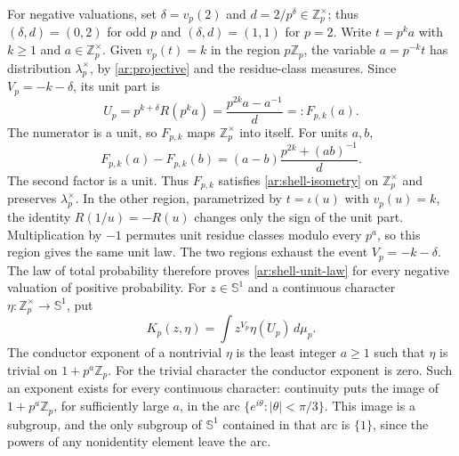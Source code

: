 \documentclass[twoside]{aomart}
\makeatletter
\theoremstyle{paperplain}
\theoremstyle{paperdefinition}
\renewenvironment{proof}[1][\proofname]{\par\pushQED{\qed}%
  \normalfont\topsep6\p@\@plus3\p@\relax\trivlist
  \item[\hskip\labelsep\itshape #1\@addpunct{.}]\ignorespaces
}{\popQED\endtrivlist\@endpefalse}
\newcommand{\Z}{\mathbb Z}
\numberwithin{equation}{section}
\makeatother
\begin{document}
\begin{proof}
For negative valuations, set $\delta=v_p(2)$ and
$d=2/p^\delta\in\Z_p^\times$; thus $(\delta,d)=(0,2)$
for odd $p$ and $(\delta,d)=(1,1)$ for $p=2$.
Write $t=p^k a$ with $k\ge1$ and $a\in\Z_p^\times$.
Given $v_p(t)=k$ in the region $p\Z_p$, the variable
$a=p^{-k}t$ has distribution $\lambda_p^\times$,
by \eqref{ar:projective} and the residue-class measures.
Since $V_p=-k-\delta$, its unit part is
\begin{equation*}
 U_p=p^{k+\delta}R(p^k a)
    =\frac{p^{2k}a-a^{-1}}d=:F_{p,k}(a).
\end{equation*}
The numerator is a unit, so $F_{p,k}$ maps
$\Z_p^\times$ into itself. For units $a,b$,
\begin{equation*}
 F_{p,k}(a)-F_{p,k}(b)
   =(a-b)\frac{p^{2k}+(ab)^{-1}}d.
\end{equation*}
The second factor is a unit. Thus $F_{p,k}$ satisfies
\eqref{ar:shell-isometry} on $\Z_p^\times$ and preserves
$\lambda_p^\times$. In the other region, parametrized by
$t=\iota(u)$ with $v_p(u)=k$, the identity
$R(1/u)=-R(u)$ changes only the sign of the unit part.
Multiplication by $-1$ permutes unit residue classes
modulo every $p^a$, so this region gives the same unit law.
The two regions exhaust the event $V_p=-k-\delta$.
The law of total probability therefore proves
\eqref{ar:shell-unit-law} for every negative valuation
of positive probability.
\end{proof}
For $z\in\mathbb S^1$ and a continuous character
$\eta:\Z_p^\times\to\mathbb S^1$, put
\begin{equation*}
 K_p(z,\eta)=\int z^{V_p}\eta(U_p)\,d\mu_p.
\end{equation*}
The conductor exponent of a nontrivial $\eta$ is the least
integer $a\ge1$ such that $\eta$ is trivial on $1+p^a\Z_p$.
For the trivial character the conductor exponent is zero.
Such an exponent exists for every continuous character:
continuity puts the image of $1+p^a\Z_p$, for sufficiently
large $a$, in the arc $\{e^{i\theta}:|\theta|<\pi/3\}$.
This image is a subgroup, and the only subgroup of
$\mathbb S^1$ contained in that arc is $\{1\}$, since the
powers of any nonidentity element leave the arc.
\end{document}
